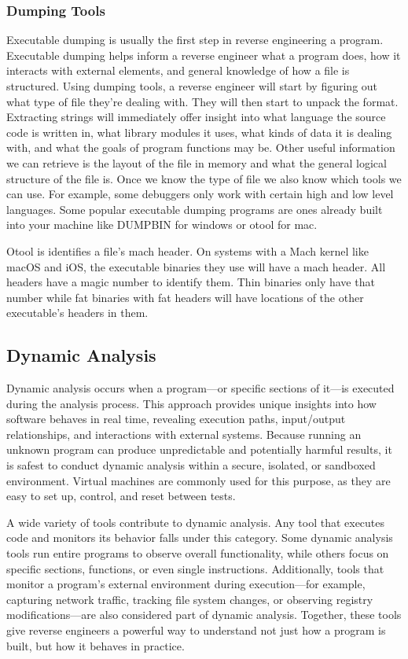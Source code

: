 \subsubsection{Dumping Tools}
Executable dumping is usually the first step in reverse engineering a program. 
Executable dumping helps inform a reverse engineer what a program does, how it interacts with external elements, and general knowledge of how a file is structured. 
Using dumping tools, a reverse engineer will start by figuring out what type of file they’re dealing with. 
They will then start to unpack the format. 
Extracting strings will immediately offer insight into what language the source code is written in, what library modules it uses, what kinds of data it is dealing with, and what the goals of program functions may be. 
Other useful information we can retrieve is the layout of the file in memory and what the general logical structure of the file is. Once we know the type of file we also know which tools we can use. 
For example, some debuggers only work with certain high and low level languages. 
Some popular executable dumping programs are ones already built into your machine like DUMPBIN for windows or otool for mac. 

Otool is identifies a file's mach header. 
On systems with a Mach kernel like macOS and iOS, the executable binaries they use will have a mach header. 
All headers have a magic number to identify them. Thin binaries only have that number while fat binaries with fat headers will have locations of the other executable's headers in them.

\subsection{Dynamic Analysis}

Dynamic analysis occurs when a program—or specific sections of it—is executed during the analysis process. This approach provides unique insights into how software behaves in real time, revealing execution paths, input/output relationships, and interactions with external systems. Because running an unknown program can produce unpredictable and potentially harmful results, it is safest to conduct dynamic analysis within a secure, isolated, or sandboxed environment. Virtual machines are commonly used for this purpose, as they are easy to set up, control, and reset between tests.

A wide variety of tools contribute to dynamic analysis. Any tool that executes code and monitors its behavior falls under this category. Some dynamic analysis tools run entire programs to observe overall functionality, while others focus on specific sections, functions, or even single instructions. Additionally, tools that monitor a program’s external environment during execution—for example, capturing network traffic, tracking file system changes, or observing registry modifications—are also considered part of dynamic analysis. Together, these tools give reverse engineers a powerful way to understand not just how a program is built, but how it behaves in practice.

